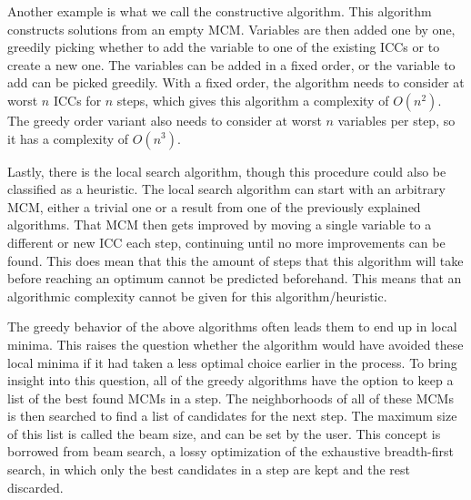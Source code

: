 Another example is what we call the constructive algorithm. This algorithm constructs solutions from an empty MCM. Variables are then added one by one, greedily picking whether to add the variable to one of the existing ICCs or to create a new one. The variables can be added in a fixed order, or the variable to add can be picked greedily. With a fixed order, the algorithm needs to consider at worst \(n\) ICCs for \(n\) steps, which gives this algorithm a complexity of \(O(n^2)\). The greedy order variant also needs to consider at worst \(n\) variables per step, so it has a complexity of \(O(n^3)\).

Lastly, there is the local search algorithm, though this procedure could also be classified as a heuristic. The local search algorithm can start with an arbitrary MCM, either a trivial one or a result from one of the previously explained algorithms. That MCM then gets improved by moving a single variable to a different or new ICC each step, continuing until no more improvements can be found. This does mean that this the amount of steps that this algorithm will take before reaching an optimum cannot be predicted beforehand. This means that an algorithmic complexity cannot be given for this algorithm/heuristic.

The greedy behavior of the above algorithms often leads them to end up in local minima. This raises the question whether the algorithm would have avoided these local minima if it had taken a less optimal choice earlier in the process. To bring insight into this question, all of the greedy algorithms have the option to keep a list of the best found MCMs in a step. The neighborhoods of all of these MCMs is then searched to find a list of candidates for the next step. The maximum size of this list is called the beam size, and can be set by the user. This concept is borrowed from beam search, a lossy optimization of the exhaustive breadth-first search, in which only the best candidates in a step are kept and the rest discarded.

